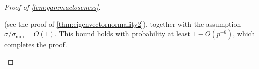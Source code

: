 \documentclass[10pt]{article}
\newcommand{\0}{{\mathbf{0}}}
\newcommand{\1}{{\mathbf{1}}}
\renewcommand{\t}{^{\top}}
\newcommand{\inv}{^{-1}}
\renewcommand{\hat}{\widehat}
\renewcommand{\hat}{\widehat}
\begin{document}
\begin{proof}[Proof of \cref{lem:gammacloseness}]
\begin{itemize}
 (see the proof of \cref{thm:eigenvectornormality2}), together with the assumption $\sigma /\sigma_{\min} = O(1)$.  This bound holds with probability at least $1 - O(p^{-6})$, which completes the proof. 
 \end{itemize}

\end{proof}
\end{document}
